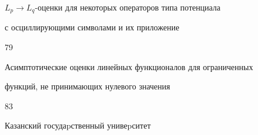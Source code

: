 

{$L_p\to L_q$-оценки для некоторых операторов типа потенциала\newline


с осциллирующими символами и их приложение}{79}




{Асимптотические оценки линейных функционалов для ограниченных \newline


функций, не принимающих нулевого значения}{83}











\vfill


\noindent\raisebox{2pt}{\copyright} Казанский госудаpственный унивеpситет





